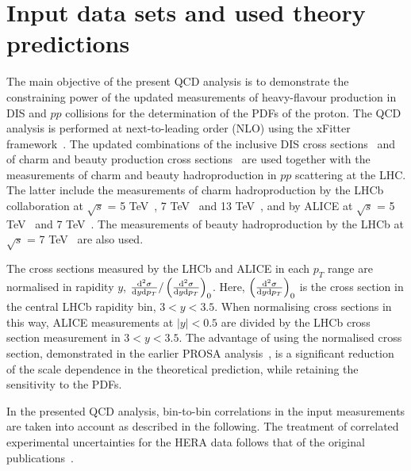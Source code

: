 \documentclass[12pt]{article}
\begin{document}
\section{Input data sets and used theory predictions}
\label{sec:qcdanalysis}

The main objective of the present QCD analysis is to demonstrate the constraining power of the updated measurements of 
heavy-flavour production in DIS and $pp$ collisions for the determination of the PDFs of the proton. 
The QCD analysis is performed at next-to-leading order (NLO) using the xFitter framework~\cite{Alekhin:2014irh}. 
The updated combinations of the inclusive DIS cross sections~\cite{Abramowicz:2015mha} and of charm and beauty production cross sections~\cite{H1:2018flt} are used together with the measurements of charm and beauty hadroproduction in $pp$ scattering at the LHC. The latter include the measurements of charm hadroproduction by the LHCb collaboration at $\sqrt{s}$ = 5 TeV~\cite{Aaij:2016jht}, 7 TeV~\cite{Aaij:2013mga} and 13 TeV~\cite{Aaij:2015bpa}, and by ALICE at $\sqrt{s}$ = 5 TeV~\cite{Acharya:2019mgn} and 7 TeV~\cite{Acharya:2017jgo}. The measurements of beauty hadroproduction by the LHCb at $\sqrt{s}$ = 7 TeV~\cite{Aaij:2013noa} are also used.

The cross sections measured by the LHCb and ALICE in each $p_T$ range are normalised in rapidity $y$, $\frac{{\rm d}^2\sigma}{{\rm d}y{\rm d}p_T} / \left(\frac{{\rm d}^2\sigma}{{\rm d}y{\rm d}p_T}\right)_{0}$. Here, $\left(\frac{{\rm d}^2\sigma}{{\rm d}y{\rm d}p_T}\right)_{0}$ is the cross section in the central LHCb rapidity bin, $3 < y < 3.5$. 
When normalising cross sections in this way, ALICE measurements at $|y| < 0.5$ are divided by the LHCb cross section measurement in $3 < y < 3.5$.
The advantage of using the normalised cross section, demonstrated in the earlier PROSA analysis~\cite{Zenaiev:2015rfa}, 
is a significant reduction of the scale dependence in the theoretical prediction,  while retaining the sensitivity to 
the PDFs. 

In the presented QCD analysis, bin-to-bin correlations in the input measurements are taken into account as described in the following. The treatment of correlated experimental uncertainties for the HERA data follows that of the original publications~\cite{Abramowicz:2015mha,H1:2018flt}.
 
\end{document}
